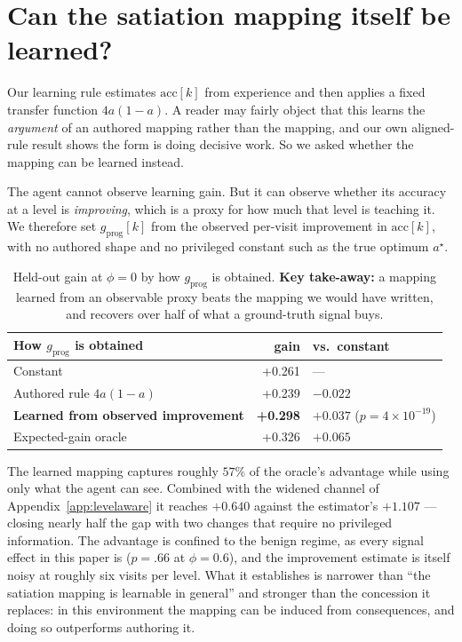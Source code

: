 \documentclass{article}
\begin{document}
\section{Can the satiation mapping itself be learned?}
\label{app:mapping}

Our learning rule estimates $\text{acc}[k]$ from experience and then applies a fixed transfer function $4a(1-a)$. A reader may fairly object that this learns the \emph{argument} of an authored mapping rather than the mapping, and our own aligned-rule result shows the form is doing decisive work. So we asked whether the mapping can be learned instead.

The agent cannot observe learning gain. But it can observe whether its accuracy at a level is \emph{improving}, which is a proxy for how much that level is teaching it. We therefore set $g_{\text{prog}}[k]$ from the observed per-visit improvement in $\text{acc}[k]$, with no authored shape and no privileged constant such as the true optimum $a^\star$.

\begin{table}[H]
  \caption{Held-out gain at $\phi{=}0$ by how $g_{\text{prog}}$ is obtained. \textbf{Key take-away:} a mapping learned from an observable proxy beats the mapping we would have written, and recovers over half of what a ground-truth signal buys.}
  \centering\small
  \begin{tabular}{lrl}
    \toprule
    How $g_{\text{prog}}$ is obtained & gain & vs.\ constant \\
    \midrule
    Constant & +0.261 & --- \\
    Authored rule $4a(1-a)$ & +0.239 & $-0.022$ \\
    \textbf{Learned from observed improvement} & \textbf{+0.298} & $+0.037$ ($p{=}4\times10^{-19}$) \\
    Expected-gain oracle & +0.326 & $+0.065$ \\
    \bottomrule
  \end{tabular}
\end{table}

The learned mapping captures roughly $57\%$ of the oracle's advantage while using only what the agent can see. Combined with the widened channel of Appendix~\ref{app:levelaware} it reaches $+0.640$ against the estimator's $+1.107$ --- closing nearly half the gap with two changes that require no privileged information. The advantage is confined to the benign regime, as every signal effect in this paper is ($p{=}.66$ at $\phi{=}0.6$), and the improvement estimate is itself noisy at roughly six visits per level. What it establishes is narrower than ``the satiation mapping is learnable in general'' and stronger than the concession it replaces: in this environment the mapping can be induced from consequences, and doing so outperforms authoring it.
\end{document}
